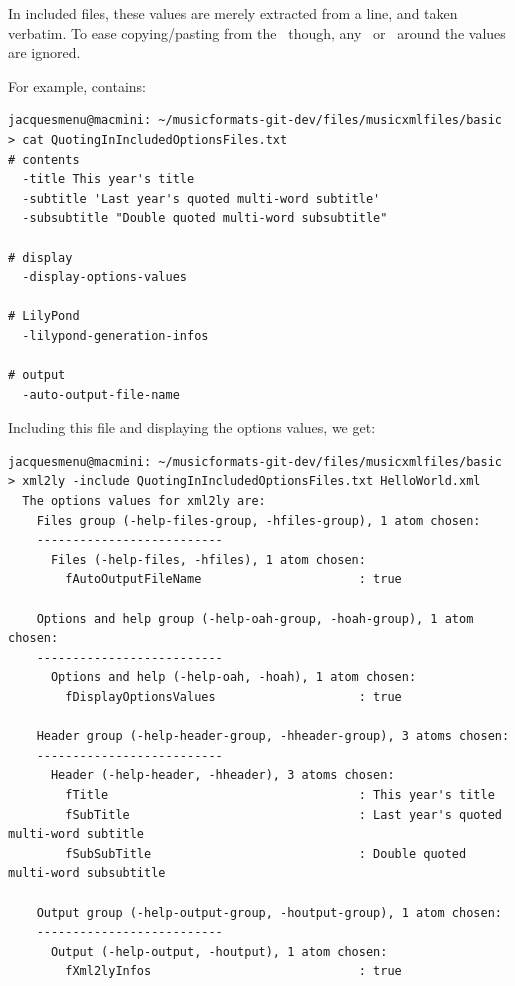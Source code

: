 In included files, these values are merely extracted from a line, and taken verbatim. To ease copying/pasting from the \CLI\, though, any \quotes\ or \doubleQuotes\ around the values are ignored.

For example,  contains:
\begin{lstlisting}[language=Terminal]
jacquesmenu@macmini: ~/musicformats-git-dev/files/musicxmlfiles/basic > cat QuotingInIncludedOptionsFiles.txt
# contents
  -title This year's title
  -subtitle 'Last year's quoted multi-word subtitle'
  -subsubtitle "Double quoted multi-word subsubtitle"

# display
  -display-options-values

# LilyPond
  -lilypond-generation-infos

# output
  -auto-output-file-name
\end{lstlisting}

Including this file and displaying the options values, we get:
\begin{lstlisting}[language=Terminal]
jacquesmenu@macmini: ~/musicformats-git-dev/files/musicxmlfiles/basic > xml2ly -include QuotingInIncludedOptionsFiles.txt HelloWorld.xml
  The options values for xml2ly are:
    Files group (-help-files-group, -hfiles-group), 1 atom chosen:
    --------------------------
      Files (-help-files, -hfiles), 1 atom chosen:
        fAutoOutputFileName                      : true

    Options and help group (-help-oah-group, -hoah-group), 1 atom chosen:
    --------------------------
      Options and help (-help-oah, -hoah), 1 atom chosen:
        fDisplayOptionsValues                    : true

    Header group (-help-header-group, -hheader-group), 3 atoms chosen:
    --------------------------
      Header (-help-header, -hheader), 3 atoms chosen:
        fTitle                                   : This year's title
        fSubTitle                                : Last year's quoted multi-word subtitle
        fSubSubTitle                             : Double quoted multi-word subsubtitle

    Output group (-help-output-group, -houtput-group), 1 atom chosen:
    --------------------------
      Output (-help-output, -houtput), 1 atom chosen:
        fXml2lyInfos                             : true
\end{lstlisting}


